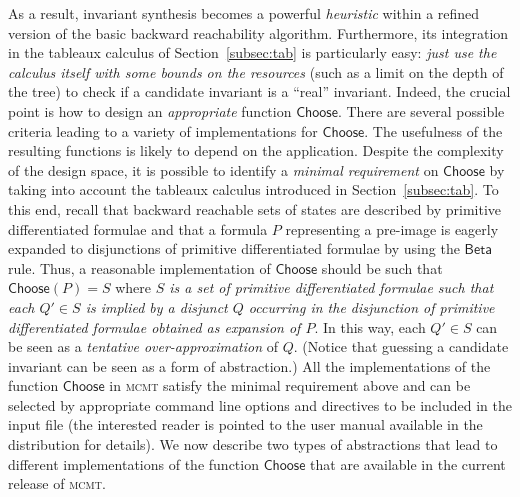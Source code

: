 \documentclass{LMCS}
\theoremstyle{plain}\newtheorem{assumption}[thm]{Assumption}
\theoremstyle{plain}\newtheorem{proposition}[thm]{Proposition}
\theoremstyle{plain}\newtheorem{property}[thm]{Property}
\theoremstyle{plain}\newtheorem{example}[thm]{Example}
\theoremstyle{plain}\newtheorem{claim}[thm]{Claim}
\theoremstyle{plain}\newtheorem{lemma}[thm]{Lemma}
\begin{document}
As a result, invariant synthesis becomes a powerful \emph{heuristic}
within a refined version of the basic backward reachability algorithm.
Furthermore, its integration in the tableaux calculus of
Section~\ref{subsec:tab} is particularly easy: \emph{just use the
  calculus itself with some bounds on the resources} (such as a limit
on the depth of the tree) to check if a candidate invariant is a
``real'' invariant.  Indeed, the crucial point is how to design an
\emph{appropriate} function $\mathsf{Choose}$.  There are several
possible criteria leading to a variety of implementations for
$\mathsf{Choose}$.  The usefulness of the resulting functions is
likely to depend on the application.  Despite the complexity of the
design space, it is possible to identify a \emph{minimal requirement}
on $\mathsf{Choose}$ by taking into account the tableaux calculus
introduced in Section~\ref{subsec:tab}. To this end, recall that
backward reachable sets of states are described by primitive
differentiated formulae and that a formula $P$ representing a
pre-image is eagerly expanded to disjunctions of primitive
differentiated formulae by using the $\mathsf{Beta}$ rule.  Thus, a
reasonable implementation of $\mathsf{Choose}$ should be such that
$\mathsf{Choose}(P)=S$ where \emph{$S$ is a set of primitive
  differentiated formulae such that each $Q'\in S$ is implied by a
  disjunct $Q$ occurring in the disjunction of primitive
  differentiated formulae obtained as expansion of $P$}.  In this way,
each $Q'\in S$ can be seen as a \emph{tentative over-approximation} of
$Q$.  (Notice that guessing a candidate invariant can be seen as a
form of abstraction.)  All the implementations of the function
$\mathsf{Choose}$ in \textsc{mcmt} satisfy the minimal requirement
above and can be selected by appropriate command line options and
directives to be included in the input file (the interested reader is
pointed to the user manual available in the distribution for details).
We now describe two types of abstractions that lead to different
implementations of the function $\mathsf{Choose}$ that are available
in the current release of \textsc{mcmt}.
\end{document}
